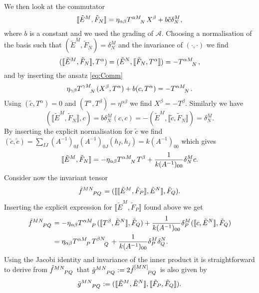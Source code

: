 We then look at the commutator 
\begin{equation}\label{eq:Comm}
    \llbracket \tilde{E}^M,\tilde{F}_N \rrbracket = \eta_{\alpha\beta}\tensor{T}{^{\alpha M}_N}\tensor{X}{^{\beta}}+b\tilde{c}\delta^M_N,
\end{equation}
where $b$ is a constant and we used the grading of $\mathscr{A}$. Choosing a normalisation of the basis such that $(\tilde{E}^M,\tilde{F}_N)=\delta^M_N$ and the invariance of $(\cdot,\cdot)$ we find 
\begin{equation}
    (\llbracket\tilde{E}^M,\tilde{F}_N\rrbracket,T^\alpha) = (\tilde{E}^N,\llbracket\tilde{F}_N,T^\alpha\rrbracket) = -\tensor{T}{^{\alpha M}_N},
\end{equation}
and by inserting the ansatz \eqref{eq:Comm}
\begin{equation}
    \eta_{\gamma\beta}\tensor{T}{^{\gamma M}_N}(X^\beta,T^\alpha)+b(c,T^\alpha) = -\tensor{T}{^{\alpha M}_N}.
\end{equation}
Using $(\tilde{c},T^\alpha)=0$ and $(T^\alpha,T^\beta)=\eta^{\alpha\beta}$ we find $X^\beta = -T^\beta$. Similarly we have 
\begin{equation}
    (\llbracket\tilde{E}^M,\tilde{F}_N\rrbracket,c) = b\delta^M_N(c,c) = -(\tilde{E}^M,\llbracket \tilde{c},\tilde{F}_N\rrbracket) = \delta^M_N.
\end{equation}
By inserting the explicit normalisation for $\tilde{c}$ we find $(\tilde{c},\tilde{c})=\sum_{IJ}(A^{-1})_{0I}(A^{-1})_{0J}(h_I,h_j)=k(A^{-1})_{00}$ which gives 
\begin{equation}
    \llbracket \tilde{E}^M,\tilde{F}_N\rrbracket = -\eta_{\alpha\beta}\tensor{T}{^{\alpha M}_N}T^\beta+\frac{1}{k(A^{-1})_{00}}\delta^M_Nc.
\end{equation}
Consider now the invariant tensor 
\begin{equation}
    \tensor{\tilde{f}}{^{MN}_{PQ}}=(\llbracket\llbracket\tilde{E}^M,\tilde{F}_P\rrbracket,\tilde{E}^N\rrbracket,\tilde{F}_Q).
\end{equation}
Inserting the explicit expression for $\llbracket\tilde{E}^M,\tilde{F}_P\rrbracket$ found above we get 
\begin{equation}
    \begin{aligned}
        \tensor{\tilde{f}}{^{MN}_{PQ}} &= -\eta_{\alpha\beta}\tensor{T}{^{\alpha M}_P}(\llbracket T^\beta,\tilde{E}^N\rrbracket,\tilde{F}_Q)+\frac{1}{k(A^{-1})_{00}}\delta^M_P(\llbracket  c,\tilde{E}^N\rrbracket,\tilde{F}_Q)\\
        & = \eta_{\alpha\beta}\tensor{T}{^{\alpha M}_P}\tensor{T}{^{\beta N}_Q}+\frac{1}{k(A^{-1})_{00}}\delta^M_P\delta^N_Q.
    \end{aligned}
\end{equation}
Using the Jacobi identity and invariance of the inner product it is straightforward to derive from $\tensor{\tilde{f}}{^{MN}_{PQ}}$ that $\tensor{\tilde{g}}{^{MN}_{PQ}}:=2\tensor{\tilde{f}}{^{[MN]}_{PQ}}$ is also given by
\begin{equation}
    \tensor{\tilde{g}}{^{MN}_{PQ}} := (\llbracket\tilde{E}^M,\tilde{E}^N\rrbracket,\llbracket\tilde{F}_P,\tilde{F}_Q\rrbracket).
\end{equation}

